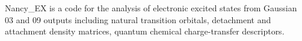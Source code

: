 Nancy\_EX is a code for the analysis of electronic excited states from Gaussian 03 and 09 outputs including natural transition orbitals, detachment and attachment density matrices, quantum chemical charge-transfer descriptors.